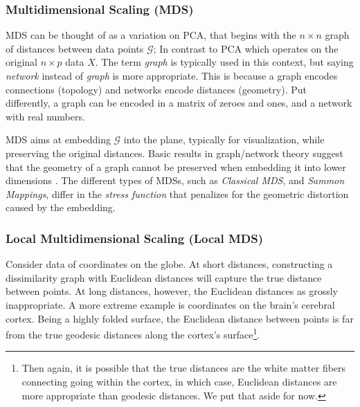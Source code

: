 \documentclass[]{book}
\theoremstyle{definition}
\theoremstyle{definition}
\theoremstyle{definition}
\theoremstyle{remark}
\let\BeginKnitrBlock\begin \let\EndKnitrBlock\end
\begin{document}
\subsubsection{Multidimensional Scaling
(MDS)}\label{multidimensional-scaling-mds}

MDS can be thought of as a variation on PCA, that begins with the
\(n \times n\) graph of distances between data points \(\mathcal{G}\);
In contrast to PCA which operates on the original \(n \times p\) data
\(X\). The term \emph{graph} is typically used in this context, but
saying \emph{network} instead of \emph{graph} is more appropriate. This
is because a graph encodes connections (topology) and networks encode
distances (geometry). Put differently, a graph can be encoded in a
matrix of zeroes and ones, and a network with real numbers.

MDS aims at embedding \(\mathcal{G}\) into the plane, typically for
visualization, while preserving the original distances. Basic results in
graph/network theory suggest that the geometry of a graph cannot be
preserved when embedding it into lower dimensions
\citep{graham1988isometric}. The different types of MDSs, such as
\emph{Classical MDS}, and \emph{Sammon Mappings}, differ in the
\emph{stress function} that penalizes for the geometric distortion
caused by the embedding.

\subsubsection{Local Multidimensional Scaling (Local
MDS)}\label{loc-mds}

\BeginKnitrBlock{example}
\protect\hypertarget{exm:non-euclidean}{}{\label{exm:non-euclidean}
}Consider data of coordinates on the globe. At short distances,
constructing a dissimilarity graph with Euclidean distances will capture
the true distance between points. At long distances, however, the
Euclidean distances as grossly inappropriate. A more extreme example is
coordinates on the brain's cerebral cortex. Being a highly folded
surface, the Euclidean distance between points is far from the true
geodesic distances along the cortex's surface\footnote{Then again, it is
  possible that the true distances are the white matter fibers
  connecting going within the cortex, in which case, Euclidean distances
  are more appropriate than geodesic distances. We put that aside for
  now.}.
\EndKnitrBlock{example}
\end{document}

